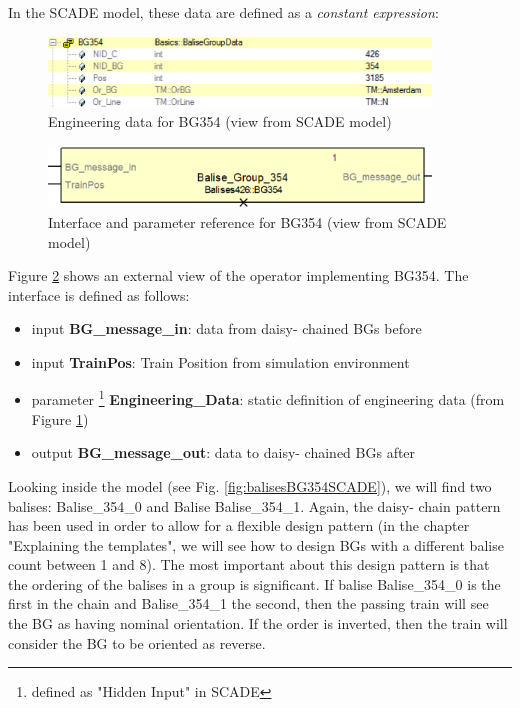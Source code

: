 \documentclass{template/openetcs_article}
\begin{document}
In the SCADE model, these data are defined as a \emph{constant expression}:
\begin{figure}[H]
  \centering
  \includegraphics[width=4in]{images/EngDataBG354SCADE.eps}
  \caption{Engineering data for BG354 (view from SCADE model)}
  \label{fig:baliseposSCADE}
\end{figure}

\begin{figure}[H]
  \centering
  \includegraphics[width=4in]{images/BG354.eps}
  \caption{Interface and parameter reference for BG354 (view from SCADE model)}
  \label{fig:BG354SCADE}
\end{figure}

Figure \ref{fig:BG354SCADE} shows an external view of the operator implementing BG354.\newline
The interface is defined as follows:
\begin{itemize}
 \item input \textbf{BG\_message\_in}: data from daisy- chained BGs before
 \item input \textbf{TrainPos}: Train Position from simulation environment
 \item parameter \footnote{defined as "Hidden Input" in SCADE} \textbf{Engineering\_Data}: static definition of engineering data (from Figure \ref{fig:baliseposSCADE})
 \item output \textbf{BG\_message\_out}: data to daisy- chained BGs after
\end{itemize}
Looking inside the model (see Fig. \ref{fig:balisesBG354SCADE}), we will find two balises: Balise\_354\_0 and Balise Balise\_354\_1. Again, the daisy- chain pattern has been used in order to allow for a flexible design pattern (in the chapter "Explaining the templates", we will see how to design BGs with a different balise count between 1 and 8).\newline
The most important about this design pattern is that the ordering of the balises in a group is significant. If balise Balise\_354\_0 is the first in the chain and Balise\_354\_1 the second, then the passing train will see the BG as having nominal orientation. If the order is inverted, then the train will consider the BG to be oriented as reverse.
\end{document}

